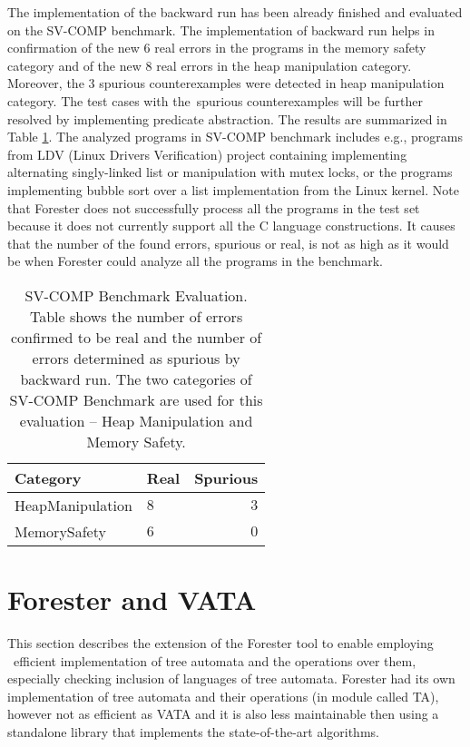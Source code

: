 \documentclass[fleqn,11pt]{ExcelAtFIT} %
\begin{document}
The implementation of the backward run has been already finished and evaluated on the SV-COMP benchmark.
The implementation of backward run helps in confirmation of the new $6$ real errors in the programs in the memory safety category and
of the new $8$ real errors in the heap manipulation category.
Moreover, the $3$ spurious counterexamples were detected in heap manipulation category.
The test cases with the~spurious counterexamples will be further resolved by implementing predicate
abstraction.
The results are summarized in Table \ref{tab:bwres}.
The analyzed programs in SV-COMP benchmark includes e.g., programs from LDV (Linux Drivers Verification) project
containing implementing alternating singly-linked list or manipulation with mutex locks, or the programs
implementing bubble sort over a list implementation from the Linux kernel.
Note that Forester does not successfully process all the programs in the test set
because it does not currently support all the C language constructions.
It causes that the number of the found errors, spurious or real, is not as high as it would be when
Forester could analyze all the programs in the benchmark.

\begin{table}[bu]
	\vskip6pt
	\caption{SV-COMP Benchmark Evaluation. Table shows the number of errors confirmed
	to be real and the number of errors determined as spurious by backward run.
	The two categories of SV-COMP Benchmark are used for this evaluation -- Heap Manipulation and Memory Safety.}
	\centering
	\begin{tabular}{llr}
		\toprule
		Category & Real & Spurious \\
		\midrule
		HeapManipulation & $8$ & $3$ \\
		MemorySafety & $6$ & $0$ \\
		\bottomrule
	\end{tabular}
	\label{tab:bwres}
\end{table}


\section{Forester and VATA}
\label{sec:forvata}

This section describes the extension of the Forester tool to enable employing \vata\ 
efficient implementation of	tree automata and the operations over them,
especially checking inclusion of languages of tree automata.
Forester had its own implementation of tree automata and their operations (in module called TA),
however not as efficient as VATA and it is also less maintainable
then using a standalone library that implements the state-of-the-art algorithms.
\end{document}
